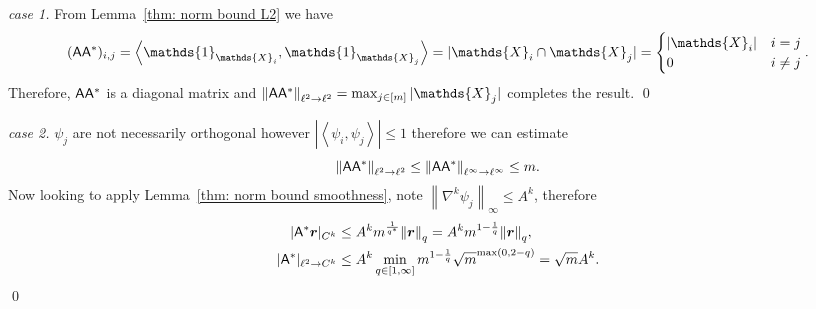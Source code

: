 \documentclass[smallextended]{svjour3}
\let\F\mathds\let\C\mathcal\newcommand{\R}{\F{R}}\newcommand{\A}{\tens{A}}
\newcommand{\norm}[1]{{\left\lVert #1 \right\rVert}}
\newcommand{\IP}[2]{\left\langle #1,#2 \right\rangle}
\newcommand{\splitln}[4]{\begin{cases} #1 & #2 \\ #3 & #4\end{cases}}
\newcommand{\1}{\F{1}}
\begin{document}
	\begin{proof}[case 1]
		From Lemma~\ref{thm: norm bound L2} we have 
		\begin{equation}
			(\A\A^*)_{i,j} = \IP{\1_{\F{X}_i}}{\1_{\F{X}_j}} = |\F{X}_i\cap \F{X}_j| = \splitln{|\F{X}_i|}{i=j}{0}{i\neq j}.
		\end{equation}
		Therefore, $\A\A^*$ is a diagonal matrix and $\norm{\A\A^*}_{\ell^2\to\ell^2} = \max_{j\in[m]} |\F{X}_j|$ completes the result.
		\qed\end{proof}
	
	\begin{proof}[case 2]
		$\psi_j$ are not necessarily orthogonal however $|\IP{\psi_i}{\psi_j}|\leq 1$ therefore we can estimate
		\begin{equation}
			\norm{\A\A^*}_{\ell^2\to\ell^2} \leq \norm{\A\A^*}_{\ell^\infty\to\ell^\infty} \leq m.
		\end{equation}
		Now looking to apply Lemma~\ref{thm: norm bound smoothness}, note $\norm{\nabla^k\psi_j}_\infty \leq A^k$, therefore
		\begin{align}
			|\A^*\vec{r}|_{C^k}&\leq A^k m^{\frac1{q^*}}\norm{\vec{r}}_q = A^k m^{1-\frac1{q}}\norm{\vec{r}}_q,
			\\|\A^*|_{\ell^2\to C^k} &\leq A^k \min_{q\in[1,\infty]}m^{1-\frac1q}\sqrt{m}^{\max(0,2-q)} = \sqrt{m}A^k.
		\end{align}
		\qed\end{proof}
	
\end{document}
